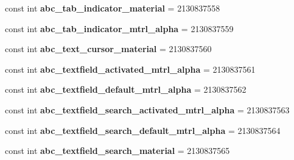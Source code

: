 \begin{DoxyCompactItemize}
\item 
\hypertarget{classClient_1_1Droid_1_1Resource_1_1Drawable_a9e2b6067d6c0875f652ea9766c719edd}{}const int {\bfseries abc\+\_\+tab\+\_\+indicator\+\_\+material} = 2130837558\label{classClient_1_1Droid_1_1Resource_1_1Drawable_a9e2b6067d6c0875f652ea9766c719edd}

\item 
\hypertarget{classClient_1_1Droid_1_1Resource_1_1Drawable_a80fe8fb551290b3c4346af815eae84a7}{}const int {\bfseries abc\+\_\+tab\+\_\+indicator\+\_\+mtrl\+\_\+alpha} = 2130837559\label{classClient_1_1Droid_1_1Resource_1_1Drawable_a80fe8fb551290b3c4346af815eae84a7}

\item 
\hypertarget{classClient_1_1Droid_1_1Resource_1_1Drawable_a19b65609e7459e30ee83a7bf3d404fbd}{}const int {\bfseries abc\+\_\+text\+\_\+cursor\+\_\+material} = 2130837560\label{classClient_1_1Droid_1_1Resource_1_1Drawable_a19b65609e7459e30ee83a7bf3d404fbd}

\item 
\hypertarget{classClient_1_1Droid_1_1Resource_1_1Drawable_ae831ffeee327962482fbdbf25c8c9448}{}const int {\bfseries abc\+\_\+textfield\+\_\+activated\+\_\+mtrl\+\_\+alpha} = 2130837561\label{classClient_1_1Droid_1_1Resource_1_1Drawable_ae831ffeee327962482fbdbf25c8c9448}

\item 
\hypertarget{classClient_1_1Droid_1_1Resource_1_1Drawable_aa704192ec14fed074f980ad2c5a0dbc4}{}const int {\bfseries abc\+\_\+textfield\+\_\+default\+\_\+mtrl\+\_\+alpha} = 2130837562\label{classClient_1_1Droid_1_1Resource_1_1Drawable_aa704192ec14fed074f980ad2c5a0dbc4}

\item 
\hypertarget{classClient_1_1Droid_1_1Resource_1_1Drawable_a546663e2482c385e4dfe0e76315d6d95}{}const int {\bfseries abc\+\_\+textfield\+\_\+search\+\_\+activated\+\_\+mtrl\+\_\+alpha} = 2130837563\label{classClient_1_1Droid_1_1Resource_1_1Drawable_a546663e2482c385e4dfe0e76315d6d95}

\item 
\hypertarget{classClient_1_1Droid_1_1Resource_1_1Drawable_ae4b909b99b6b4be07827e2fdd8db553e}{}const int {\bfseries abc\+\_\+textfield\+\_\+search\+\_\+default\+\_\+mtrl\+\_\+alpha} = 2130837564\label{classClient_1_1Droid_1_1Resource_1_1Drawable_ae4b909b99b6b4be07827e2fdd8db553e}

\item 
\hypertarget{classClient_1_1Droid_1_1Resource_1_1Drawable_ab4a64f8339a5a2020835a7df99063063}{}const int {\bfseries abc\+\_\+textfield\+\_\+search\+\_\+material} = 2130837565\label{classClient_1_1Droid_1_1Resource_1_1Drawable_ab4a64f8339a5a2020835a7df99063063}


\end{DoxyCompactItemize}
